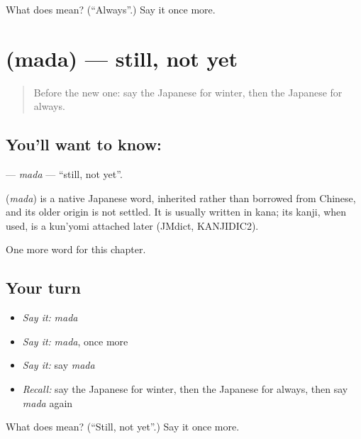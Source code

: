 \begin{tcolorbox}[breakable,colback=teal!4,colframe=teal!35!black,title={Before you move on}]
What does  mean? (\textquotedblleft{}Always\textquotedblright{}.) Say it once more.
\end{tcolorbox}
\section[\texorpdfstring{\ja{まだ} (mada)}{まだ (mada)}]{ (mada) — still, not yet}

\label{lesson:JA-C55-mada}



\begin{quote}
Before the new one: say the Japanese for winter, then the Japanese for always.
\end{quote}

\subsection*{You'll want to know: }
\textbf{} — \emph{mada} — \textquotedblleft{}still, not yet\textquotedblright{}.

\begin{cousinweb}
\textbf{} (\emph{mada}) is a native Japanese word, inherited rather than borrowed from Chinese, and its older origin is not settled. It is usually written in kana; its kanji, when used, is a kun'yomi attached later (JMdict, KANJIDIC2).
\end{cousinweb}

\begin{grammarlens}[title={What you've built}]
One more word for this chapter.
\end{grammarlens}

\subsection*{Your turn}
\begin{itemize}
\raggedright
  \item \emph{Say it:} \emph{mada}
  \item \emph{Say it:} \emph{mada}, once more
  \item \emph{Say it:} say \emph{mada}
  \item \emph{Recall:} say the Japanese for winter, then the Japanese for always, then say \emph{mada} again
\end{itemize}

\begin{tcolorbox}[breakable,colback=teal!4,colframe=teal!35!black,title={Before you move on}]
What does  mean? (\textquotedblleft{}Still, not yet\textquotedblright{}.) Say it once more.
\end{tcolorbox}
